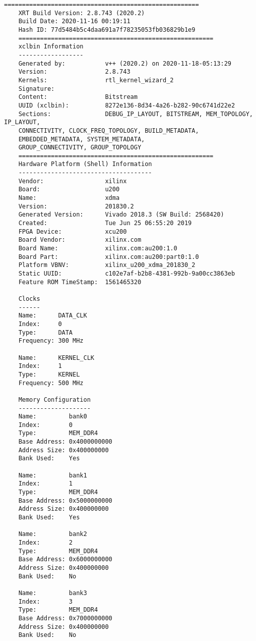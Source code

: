 \lstset{language=Pascal}          %
\begin{lstlisting}[caption=Содержимое файла vinc.xclbin.info, label={infof}]
	======================================================
	XRT Build Version: 2.8.743 (2020.2)
	Build Date: 2020-11-16 00:19:11
	Hash ID: 77d5484b5c4daa691a7f78235053fb036829b1e9
	======================================================
	xclbin Information
	------------------
	Generated by:           v++ (2020.2) on 2020-11-18-05:13:29
	Version:                2.8.743
	Kernels:                rtl_kernel_wizard_2
	Signature:              
	Content:                Bitstream
	UUID (xclbin):          8272e136-8d34-4a26-b282-90c6741d22e2
	Sections:               DEBUG_IP_LAYOUT, BITSTREAM, MEM_TOPOLOGY, IP_LAYOUT, 
	CONNECTIVITY, CLOCK_FREQ_TOPOLOGY, BUILD_METADATA, 
	EMBEDDED_METADATA, SYSTEM_METADATA, 
	GROUP_CONNECTIVITY, GROUP_TOPOLOGY
	======================================================
	Hardware Platform (Shell) Information
	-------------------------------------
	Vendor:                 xilinx
	Board:                  u200
	Name:                   xdma
	Version:                201830.2
	Generated Version:      Vivado 2018.3 (SW Build: 2568420)
	Created:                Tue Jun 25 06:55:20 2019
	FPGA Device:            xcu200
	Board Vendor:           xilinx.com
	Board Name:             xilinx.com:au200:1.0
	Board Part:             xilinx.com:au200:part0:1.0
	Platform VBNV:          xilinx_u200_xdma_201830_2
	Static UUID:            c102e7af-b2b8-4381-992b-9a00cc3863eb
	Feature ROM TimeStamp:  1561465320
	
	Clocks
	------
	Name:      DATA_CLK
	Index:     0
	Type:      DATA
	Frequency: 300 MHz
	
	Name:      KERNEL_CLK
	Index:     1
	Type:      KERNEL
	Frequency: 500 MHz
	
	Memory Configuration
	--------------------
	Name:         bank0
	Index:        0
	Type:         MEM_DDR4
	Base Address: 0x4000000000
	Address Size: 0x400000000
	Bank Used:    Yes
	
	Name:         bank1
	Index:        1
	Type:         MEM_DDR4
	Base Address: 0x5000000000
	Address Size: 0x400000000
	Bank Used:    Yes
	
	Name:         bank2
	Index:        2
	Type:         MEM_DDR4
	Base Address: 0x6000000000
	Address Size: 0x400000000
	Bank Used:    No
	
	Name:         bank3
	Index:        3
	Type:         MEM_DDR4
	Base Address: 0x7000000000
	Address Size: 0x400000000
	Bank Used:    No
	

\end{lstlisting}
